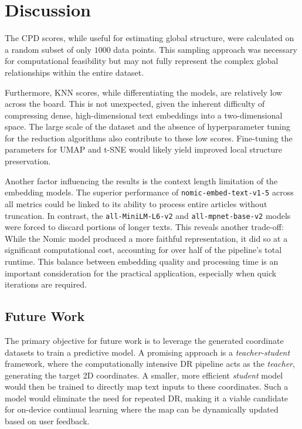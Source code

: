 \section{Discussion}
\label{sec:discussion}

The CPD scores, while useful for estimating global structure, were calculated on a random subset of only $1000$ data points. This sampling approach was necessary for computational feasibility but may not fully represent the complex global relationships within the entire dataset.

Furthermore, KNN scores, while differentiating the models, are relatively low across the board. This is not unexpected, given the inherent difficulty of compressing dense, high-dimensional text embeddings into a two-dimensional space. The large scale of the dataset and the absence of hyperparameter tuning for the reduction algorithms also contribute to these low scores. Fine-tuning the parameters for UMAP and t-SNE would likely yield improved local structure preservation.

Another factor influencing the results is the context length limitation of the embedding models. The superior performance of \texttt{nomic-embed-text-v1-5} across all metrics could be linked to its ability to process entire articles without truncation. In contrast, the \texttt{all-MiniLM-L6-v2} and \texttt{all-mpnet-base-v2} models were forced to discard portions of longer texts. This reveals another trade-off: While the Nomic model produced a more faithful representation, it did so at a significant computational cost, accounting for over half of the pipeline's total runtime. This balance between embedding quality and processing time is an important consideration for the practical application, especially when quick iterations are required.

\subsection{Future Work}
\label{sec:future-work}

The primary objective for future work is to leverage the generated coordinate datasets to train a predictive model. A promising approach is a \textit{teacher-student} framework, where the computationally intensive DR pipeline acts as the \textit{teacher}, generating the target 2D coordinates. A smaller, more efficient \textit{student} model would then be trained to directly map text inputs to these coordinates. Such a model would eliminate the need for repeated DR, making it a viable candidate for on-device continual learning where the map can be dynamically updated based on user feedback.

